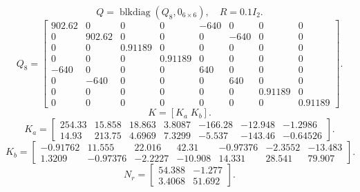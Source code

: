 
\[Q=\operatorname{blkdiag}(Q_8,0_{6\times6}),\quad R=0.1 I_2.\]
{\small\[Q_8=\begin{bmatrix}902.62 & 0 & 0 & 0 & -640 & 0 & 0 & 0\\
0 & 902.62 & 0 & 0 & 0 & -640 & 0 & 0\\
0 & 0 & 0.91189 & 0 & 0 & 0 & 0 & 0\\
0 & 0 & 0 & 0.91189 & 0 & 0 & 0 & 0\\
-640 & 0 & 0 & 0 & 640 & 0 & 0 & 0\\
0 & -640 & 0 & 0 & 0 & 640 & 0 & 0\\
0 & 0 & 0 & 0 & 0 & 0 & 0.91189 & 0\\
0 & 0 & 0 & 0 & 0 & 0 & 0 & 0.91189\end{bmatrix}.\]}
\[K=[K_a\;K_b].\]
{\small\[K_a=\begin{bmatrix}254.33 & 15.858 & 18.863 & 3.8087 & -166.28 & -12.948 & -1.2986\\
14.93 & 213.75 & 4.6969 & 7.3299 & -5.537 & -143.46 & -0.64526\end{bmatrix}.\]}
{\small\[K_b=\begin{bmatrix}-0.91762 & 11.555 & 22.016 & 42.31 & -0.97376 & -2.3552 & -13.483\\
1.3209 & -0.97376 & -2.2227 & -10.908 & 14.331 & 28.541 & 79.907\end{bmatrix}.\]}
\[N_r=\begin{bmatrix}54.388 & -1.277\\
3.4068 & 51.692\end{bmatrix}.\]
